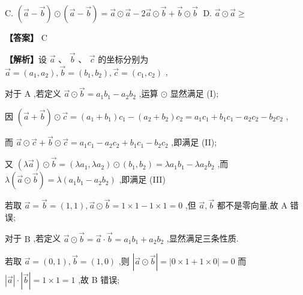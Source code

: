 \documentclass[10pt]{article}
\begin{document}
C. \(\left( {\overrightarrow{a} - \overrightarrow{b}}\right)  \odot  \left( {\overrightarrow{a} - \overrightarrow{b}}\right)  = \overrightarrow{a} \odot  \overrightarrow{a} - 2\overrightarrow{a} \odot  \overrightarrow{b} + \overrightarrow{b} \odot  \overrightarrow{b}\;\) D. \(\overrightarrow{a} \odot  \overrightarrow{a} \geq\)

\textbf{【答案】} C

\textbf{【解析】}设 \(\overrightarrow{a}\text{ 、 }\overrightarrow{b}\text{ 、 }\overrightarrow{c}\) 的坐标分别为 \(\overrightarrow{a} = \left( {{a}_{1},{a}_{2}}\right) ,\overrightarrow{b} = \left( {{b}_{1},{b}_{2}}\right) ,\overrightarrow{c} = \left( {{c}_{1},{c}_{2}}\right)\) ,

对于 \(\mathrm{A}\) ,若定义 \(\overrightarrow{a} \odot  \overrightarrow{b} = {a}_{1}{b}_{1} - {a}_{2}{b}_{2}\) ,运算 \(\odot\) 显然满足 (I);

因 \(\left( {\overrightarrow{a} + \overrightarrow{b}}\right)  \odot  \overrightarrow{c} = \left( {{a}_{1} + {b}_{1}}\right) {c}_{1} - \left( {{a}_{2} + {b}_{2}}\right) {c}_{2} = {a}_{1}{c}_{1} + {b}_{1}{c}_{1} - {a}_{2}{c}_{2} - {b}_{2}{c}_{2}\) ,

而 \(\overrightarrow{a} \odot  \overrightarrow{c} + \overrightarrow{b} \odot  \overrightarrow{c} = {a}_{1}{c}_{1} - {a}_{2}{c}_{2} + {b}_{1}{c}_{1} - {b}_{2}{c}_{2}\) ,即满足 (II);

又 \(\left( {\lambda \overrightarrow{a}}\right)  \odot  \overrightarrow{b} = \left( {\lambda {a}_{1},\lambda {a}_{2}}\right)  \odot  \left( {{b}_{1},{b}_{2}}\right)  = \lambda {a}_{1}{b}_{1} - \lambda {a}_{2}{b}_{2}\) ,而 \(\lambda \left( {\overrightarrow{a} \odot  \overrightarrow{b}}\right)  = \lambda \left( {{a}_{1}{b}_{1} - {a}_{2}{b}_{2}}\right)\) ,即满足 (III)

若取 \(\overrightarrow{a} = \overrightarrow{b} = \left( {1,1}\right) ,\overrightarrow{a} \odot  \overrightarrow{b} = 1 \times  1 - 1 \times  1 = 0\) ,但 \(\overrightarrow{a},\overrightarrow{b}\) 都不是零向量,故 \(\mathrm{A}\) 错误;

对于 \(\mathrm{B}\) ,若定义 \(\overrightarrow{a} \odot  \overrightarrow{b} = \overrightarrow{a} \cdot  \overrightarrow{b} = {a}_{1}{b}_{1} + {a}_{2}{b}_{2}\) ,显然满足三条性质.

若取 \(\overrightarrow{a} = \left( {0,1}\right) ,\overrightarrow{b} = \left( {1,0}\right)\) ,则 \(\left| {\overrightarrow{a} \odot  \overrightarrow{b}}\right|  = \left| {0 \times  1 + 1 \times  0}\right|  = 0\) 而 \(\left| \overrightarrow{a}\right|  \cdot  \left| \overrightarrow{b}\right|  = 1 \times  1 = 1\) ,故 B 错误;
\end{document}
